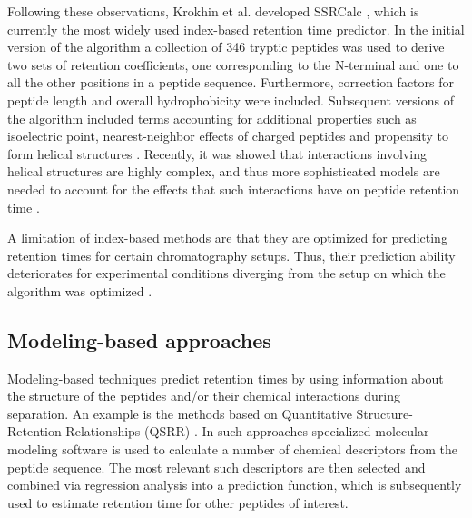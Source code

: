 \documentclass[a4paper]{article}
\begin{document}
Following these observations, Krokhin et al. developed SSRCalc
\cite{Krokhin2004}, which is currently the most widely used
index-based retention time predictor. In the initial version of the
algorithm a collection of 346 tryptic peptides was used to derive two
sets of retention coefficients, one corresponding to the N-terminal
and one to all the other positions in a peptide sequence. Furthermore,
correction factors for peptide length and overall hydrophobicity were
included. Subsequent versions of the algorithm included terms
accounting for additional properties such as isoelectric point,
nearest-neighbor effects of charged peptides and propensity to form
helical structures \cite{Krokhin2006}. Recently, it was showed that
interactions involving helical structures are highly complex, and thus
more sophisticated models are needed to account for the effects that
such interactions have on peptide retention time \cite{ah}.

A limitation of index-based methods are that they are optimized for
predicting retention times for certain chromatography setups. Thus,
their prediction ability deteriorates for experimental conditions
diverging from the setup on which the algorithm was optimized
\cite{Spicer2007}.



\subsection{Modeling-based approaches}

Modeling-based techniques predict retention times by using information
about the structure of the peptides and/or their chemical interactions
during separation. An example is the methods based on Quantitative
Structure-Retention Relationships (QSRR) \cite{Kaliszan2005,
Baczek2005}. In such approaches specialized molecular modeling
software is used to calculate a number of chemical descriptors from
the peptide sequence. The most relevant such descriptors are then
selected and combined via regression analysis into a prediction
function, which is subsequently used to estimate retention time for
other peptides of interest.
\end{document}
